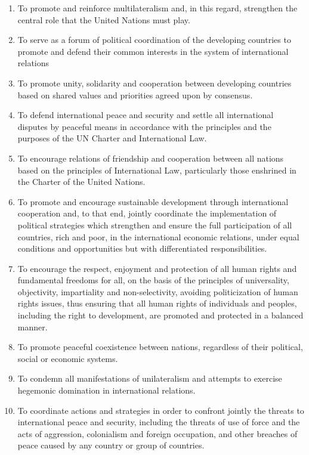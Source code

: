 \documentclass[
  openany]{book}
\begin{document}
\begin{enumerate}
\def\labelenumi{\alph{enumi}.}
\item
  To promote and reinforce multilateralism and, in this regard, strengthen the central role that the United Nations must play.
\item
  To serve as a forum of political coordination of the developing countries to promote and defend their common interests in the system of international relations
\item
  To promote unity, solidarity and cooperation between developing countries based on shared values and priorities agreed upon by consensus.
\item
  To defend international peace and security and settle all international disputes by peaceful means in accordance with the principles and the purposes of the UN Charter and International Law.
\item
  To encourage relations of friendship and cooperation between all nations based on the principles of International Law, particularly those enshrined in the Charter of the United Nations.
\item
  To promote and encourage sustainable development through international cooperation and, to that end, jointly coordinate the implementation of political strategies which strengthen and ensure the full participation of all countries, rich and poor, in the international economic relations, under equal conditions and opportunities but with differentiated responsibilities.
\item
  To encourage the respect, enjoyment and protection of all human rights and fundamental freedoms for all, on the basis of the principles of universality, objectivity, impartiality and non-selectivity, avoiding politicization of human rights issues, thus ensuring that all human rights of individuals and peoples, including the right to development, are promoted and protected in a balanced manner.
\item
  To promote peaceful coexistence between nations, regardless of their political, social or economic systems.
\item
  To condemn all manifestations of unilateralism and attempts to exercise hegemonic domination in international relations.
\item
  To coordinate actions and strategies in order to confront jointly the threats to international peace and security, including the threats of use of force and the acts of aggression, colonialism and foreign occupation, and other breaches of peace caused by any country or group of countries.

\end{enumerate}
\end{document}
